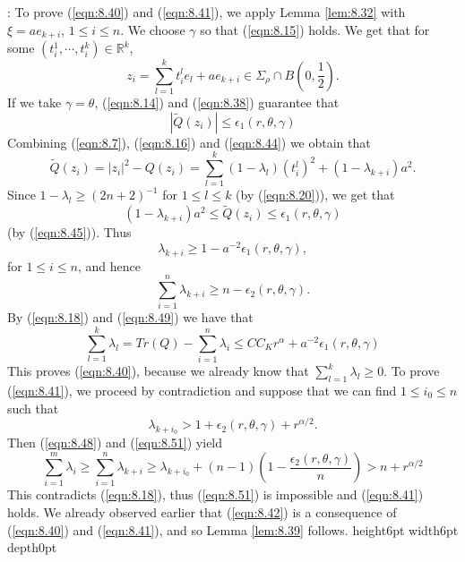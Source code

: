 \documentclass[12pt,leqno]{article}
\newcommand\qed{\hfill\vrule height6pt width6pt depth0pt}
\newcommand{\RR}{\mathbb{R}}
\theoremstyle{plain}
\numberwithin{equation}{section}
\begin{document}
: To prove (\ref{eqn:8.40}) and
(\ref{eqn:8.41}), we apply Lemma \ref{lem:8.32}
with $\xi=ae_{k+i}$, $1\le i\le n$. We choose $\gamma$ so that
(\ref{eqn:8.15}) holds. We get that for some $(t_i^1,\cdots, t_i^k)\in\RR^k$,
\begin{equation}\label{eqn:8.44}
z_i=\sum_{l=1}^k t_i^le_l+ae_{k+i}\in\Sigma_\rho\cap B(0, \frac{1}{2}).
\end{equation}
If we take $\gamma=\theta$, (\ref{eqn:8.14}) and (\ref{eqn:8.38}) guarantee that
\begin{equation}\label{eqn:8.45}
|\widetilde Q(z_i)|\le \epsilon_1(r,\theta,\gamma)
\end{equation}
Combining (\ref{eqn:8.7}), (\ref{eqn:8.16}) and (\ref{eqn:8.44}) we obtain
that
\begin{equation}\label{eqn:8.46}
\widetilde Q(z_i)  =  |z_i|^2-Q(z_i)
 =  \sum_{l=1}^k(1-\lambda_l)(t_i^l)^2 + (1-\lambda_{k+i})a^2.
\end{equation}
Since $1-\lambda_l\ge (2n+2)^{-1}$ for $1\le l\le k$
(by (\ref{eqn:8.20})), we get that
\begin{equation}\label{eqn:8.47}
(1-\lambda_{k+i})a^2\le\widetilde Q(z_i)\le \epsilon_1(r,\theta,\gamma)
\end{equation}
(by (\ref{eqn:8.45})). Thus
\begin{equation}\label{eqn:8.48}
\lambda_{k+i}\ge 1-a^{-2}\epsilon_1(r,\theta,\gamma),
\end{equation}
for $1\le i\le n$, and hence
\begin{equation}\label{eqn:8.49}
\sum^n_{i=1}\lambda_{k+i}\ge n-\epsilon_2(r,\theta,\gamma).
\end{equation}
By (\ref{eqn:8.18}) and (\ref{eqn:8.49}) we have that
\begin{equation}\label{eqn:8.50}
\sum_{l=1}^k\lambda_l=Tr(Q)-\sum^n_{i=1}\lambda_i\le CC_Kr^\alpha+
a^{-2}\epsilon_1(r,\theta,\gamma)
\end{equation}
This proves (\ref{eqn:8.40}), because we already know that
$\sum_{l=1}^k\lambda_l\ge 0$.
To prove (\ref{eqn:8.41}), we proceed by contradiction and suppose that we
can find $1\le i_0\le n$ such that
\begin{equation}\label{eqn:8.51}
\lambda_{k+i_0}>1+\epsilon_2(r,\theta,\gamma)+r^{\alpha/2}.
\end{equation}
Then (\ref{eqn:8.48}) and
(\ref{eqn:8.51}) yield
\begin{equation}\label{eqn:8.52}
\sum^m_{i=1}\lambda_i  \ge  \sum^n_{i=1}\lambda_{k+i}
 \ge  \lambda_{k+i_0} + (n-1)(1-\frac{\epsilon_2(r,\theta,\gamma)}{n})
 >  n + r^{\alpha/2}
\end{equation}
This contradicts (\ref{eqn:8.18}), thus (\ref{eqn:8.51}) is impossible and
(\ref{eqn:8.41}) holds. We already observed earlier that (\ref{eqn:8.42}) is a consequence of
(\ref{eqn:8.40}) and (\ref{eqn:8.41}), and so
Lemma \ref{lem:8.39}
follows. \qed
\medskip
\end{document}
